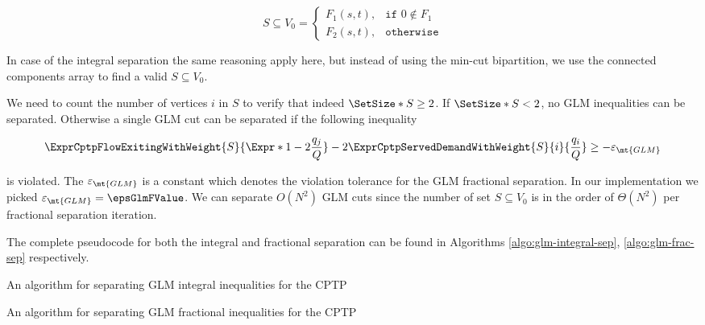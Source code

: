 \begin{equation}
	S \subseteq V_0 =
	\begin{cases}
		F_1(s, t), & \texttt{if } 0 \notin F_1 \\
		F_2(s, t), & \texttt{otherwise}
	\end{cases}
\end{equation}

In case of the integral separation the same reasoning apply here, but instead of using the min-cut bipartition, we use the connected components array to find a valid $S \subseteq V_0$.

We need to count the number of vertices $i$ in $S$ to verify that indeed $\SetSize*{S} \ge 2$.
If $\SetSize*{S} < 2$, no GLM inequalities can be separated.
Otherwise a single GLM cut can be separated if the following inequality

\begin{equation}
	\begin{split}
		\ExprCptpFlowExitingWithWeight{S}{\Expr*{1 - 2 \frac{q_j}{Q}}} - 2 	\ExprCptpServedDemandWithWeight{S}{i}{\frac{q_i}{Q}} \ge - \varepsilon_{\mt{GLM}}
	\end{split}
\end{equation}

is violated.
The $\varepsilon_{\mt{GLM}}$ is a constant which denotes the violation tolerance for the GLM fractional separation.
In our implementation we picked $\varepsilon_{\mt{GLM}} = \epsGlmFValue$.
We can separate $O(N^2)$ GLM cuts since the number of set $S \subseteq V_0$ is in the order of $\Theta(N^2)$ per fractional separation iteration.

The complete pseudocode for both the integral and fractional separation can be found in Algorithms \ref{algo:glm-integral-sep}, \ref{algo:glm-frac-sep} respectively.

\begin{algorithm}
	\caption{An algorithm for separating GLM integral inequalities for the CPTP}
	\label{algo:glm-integral-sep}
	
\end{algorithm}

\begin{algorithm}
	\caption{An algorithm for separating GLM fractional inequalities for the CPTP}
	\label{algo:glm-frac-sep}
	
\end{algorithm}
